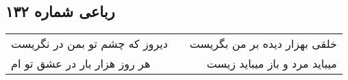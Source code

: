 \begin{center}
\section*{رباعی شماره ۱۳۲}
\label{sec:sh132}
\begin{longtable}{l p{0.5cm} r}
دیروز که چشم تو بمن در نگریست
&&
خلقی بهزار دیده بر من بگریست
\\
هر روز هزار بار در عشق تو ام
&&
میباید مرد و باز میباید زیست
\\
\end{longtable}
\end{center}
